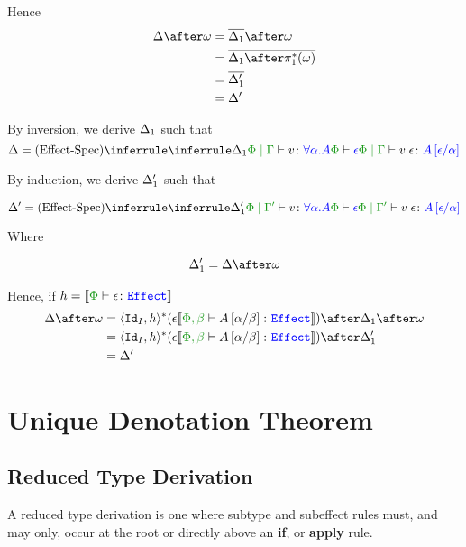 \documentclass{report}
\begin{document}
    Hence \begin{align*}
        \D\after\w & = \bar{\D_1}\after\w\\
        & = \bar{\D_1\after\pstar(\w)}\\
        & = \bar{\D_1'}\\
        & = \D'
    \end{align*}
    
    By inversion, we derive $\Delta_1$ such that
    \begin{equation}
        \D = \ntreeruleII{Effect-Spec}{\treeruleI{\D_1}{\etyperelation{\P}{\G}{v}{\all{\a}{A}}}}{\wellformed{\P}{\e}}{\etyperelation{\P}{\G}{\eapp{v}{\e}}{A\ssub{\a}{\e}}}
    \end{equation}
    
    By induction, we derive $\Delta_1'$ such that
    
    \begin{equation}
        \D' = \ntreeruleII{Effect-Spec}{\treeruleI{\D_1'}{\etyperelation{\P}{\G'}{v}{\all{\a}{A}}}}{\wellformed{\P}{\e}}{\etyperelation{\P}{\G'}{\eapp{v}{\e}}{A\ssub{\a}{\e}}}
    \end{equation}
    
    Where 
    
    \begin{align*}
        \D_1' = \D\after\w
    \end{align*}
    
    
    
    Hence, if $h = \deno{\typerelation{\P}{\e}{\effect}}$
    \begin{align*}
        \D\after\w &= \pr{\Id{I}}{h}\star(\e{\deno{\typerelation{\P,\b}{A\ssub{\b}{\a}}{\effect}}})\after\D_1\after\w\\
        &= \pr{\Id{I}}{h}\star(\e{\deno{\typerelation{\P,\b}{A\ssub{\b}{\a}}{\effect}}})\after\D_1'\\
        & = \D'
    \end{align*}
    
\chapter{Unique Denotation Theorem}

\section{Reduced Type Derivation}
    A reduced type derivation is one where subtype and subeffect rules must, and may only, occur at the root or directly above an \textbf{if}, or \textbf{apply} rule.
    
\end{document}
